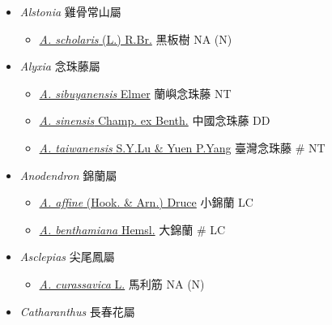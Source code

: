 
  \begin{itemize}
 \item[] \textit{Alstonia} 雞骨常山屬
                                
  \begin{itemize}
        \item[] \href{http://www.theplantlist.org/tpl1.1/search?q=Alstonia+scholaris}{\textit{A. scholaris} (L.) R.Br.}   黑板樹   NA (N)
  \end{itemize}
 \item[] \textit{Alyxia} 念珠藤屬
                                
  \begin{itemize}
        \item[] \href{http://www.theplantlist.org/tpl1.1/search?q=Alyxia+sibuyanensis}{\textit{A. sibuyanensis} Elmer}   蘭嶼念珠藤   NT
        \item[] \href{http://www.theplantlist.org/tpl1.1/search?q=Alyxia+sinensis}{\textit{A. sinensis} Champ. ex Benth.}   中國念珠藤   DD
        \item[] \href{http://www.theplantlist.org/tpl1.1/search?q=Alyxia+taiwanensis}{\textit{A. taiwanensis} S.Y.Lu \& Yuen P.Yang}   臺灣念珠藤  \# NT
  \end{itemize}
 \item[] \textit{Anodendron} 錦蘭屬
                                
  \begin{itemize}
        \item[] \href{http://www.theplantlist.org/tpl1.1/search?q=Anodendron+affine}{\textit{A. affine} (Hook. \& Arn.) Druce}   小錦蘭   LC
        \item[] \href{http://www.theplantlist.org/tpl1.1/search?q=Anodendron+benthamiana}{\textit{A. benthamiana} Hemsl.}   大錦蘭  \# LC
  \end{itemize}
 \item[] \textit{Asclepias} 尖尾鳳屬
                                
  \begin{itemize}
        \item[] \href{http://www.theplantlist.org/tpl1.1/search?q=Asclepias+curassavica}{\textit{A. curassavica} L.}   馬利筋   NA (N)
  \end{itemize}
 \item[] \textit{Catharanthus} 長春花屬
                                

\end{itemize}
